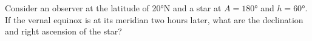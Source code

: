\documentclass[main.tex]{subfiles}
\begin{document}
\begin{q}{4}
Consider an observer at the latitude of \ang{20}N and a star at $A = \ang{180}$ and $h = \ang{60}$. If the vernal equinox is at its meridian two hours later, what are the declination and right ascension of the star?
\end{q}

\begin{sol}

\end{sol}
\end{document}
